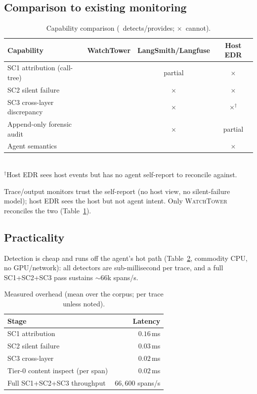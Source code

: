 \documentclass[conference]{IEEEtran}
\newcommand{\cmark}{\checkmark}
\newcommand{\xmark}{\ensuremath{\times}}
\begin{document}
\subsection{Comparison to existing monitoring}
\begin{table}[t]
\caption{Capability comparison (\cmark\ detects/provides; \xmark\ cannot).}
\label{tab:compare}
\centering\footnotesize
\begin{tabular}{lccc}
\toprule
Capability & WatchTower & LangSmith/Langfuse & Host EDR \\
\midrule
SC1 attribution (call-tree)  & \cmark & partial & \xmark \\
SC2 silent failure           & \cmark & \xmark  & \xmark \\
SC3 cross-layer discrepancy  & \cmark & \xmark  & \xmark$^\dagger$ \\
Append-only forensic audit   & \cmark & \xmark  & partial \\
Agent semantics              & \cmark & \cmark  & \xmark \\
\bottomrule
\end{tabular}
\\[2pt]{\scriptsize $^\dagger$Host EDR sees host events but has no agent self-report to
reconcile against.}
\end{table}
Trace/output monitors trust the self-report (no host view, no silent-failure model); host EDR
sees the host but not agent intent. Only \textsc{WatchTower} reconciles the two
(Table~\ref{tab:compare}).

\subsection{Practicality}
Detection is cheap and runs off the agent's hot path (Table~\ref{tab:overhead}, commodity CPU,
no GPU/network): all detectors are sub-millisecond per trace, and a full SC1+SC2+SC3 pass
sustains $\sim$66k spans/s.

\begin{table}[t]
\caption{Measured overhead (mean over the corpus; per trace unless noted).}
\label{tab:overhead}
\centering\footnotesize
\begin{tabular}{lr}
\toprule
Stage & Latency \\
\midrule
SC1 attribution             & $0.16$\,ms \\
SC2 silent failure          & $0.03$\,ms \\
SC3 cross-layer             & $0.02$\,ms \\
Tier-0 content inspect (per span) & $0.02$\,ms \\
\midrule
Full SC1+SC2+SC3 throughput & $66{,}600$ spans/s \\
\bottomrule
\end{tabular}
\end{table}
\end{document}
